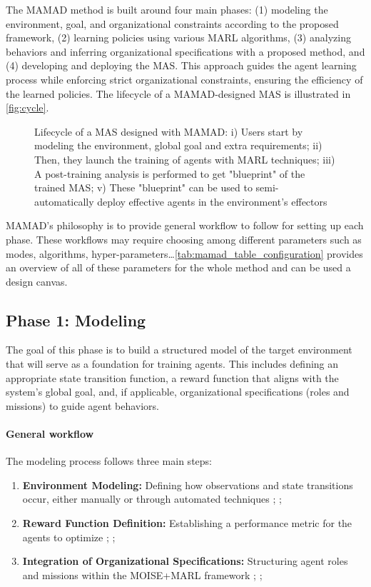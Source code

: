 \documentclass[pdflatex,sn-mathphys-num]{sn-jnl}%
\theoremstyle{thmstyleone}%
\theoremstyle{thmstyletwo}%
\theoremstyle{thmstylethree}%
\begin{document}
The MAMAD method is built around four main phases: (1) modeling the environment, goal, and organizational constraints according to the proposed framework, (2) learning policies using various MARL algorithms, (3) analyzing behaviors and inferring organizational specifications with a proposed method, and (4) developing and deploying the MAS. This approach guides the agent learning process while enforcing strict organizational constraints, ensuring the efficiency of the learned policies. The lifecycle of a MAMAD-designed MAS is illustrated in \autoref{fig:cycle}.



\begin{figure}[h!]
  \centering
  
  \caption{Lifecycle of a MAS designed with MAMAD: i) Users start by modeling the environment, global goal and extra requirements; \quad ii) Then, they launch the training of agents with MARL techniques; \quad iii) A post-training analysis is performed to get "blueprint" of the trained MAS; \quad v) These "blueprint" can be used to semi-automatically deploy effective agents in the environment's effectors}
  \label{fig:cycle}
\end{figure}

MAMAD's philosophy is to provide general workflow to follow for setting up each phase. These workflows may require choosing among different parameters such as modes, algorithms, hyper-parameters\dots \autoref{tab:mamad_table_configuration} provides an overview of all of these parameters for the whole method and can be used a design canvas.



\subsection{Phase 1: Modeling}

The goal of this phase is to build a structured model of the target environment that will serve as a foundation for training agents. This includes defining an appropriate state transition function, a reward function that aligns with the system's global goal, and, if applicable, organizational specifications (roles and missions) to guide agent behaviors.

\paragraph{\textbf{General workflow}}
The modeling process follows three main steps:
\begin{enumerate}
    \item \textbf{Environment Modeling:} Defining how observations and state transitions occur, either manually or through automated techniques ; ;
    \item \textbf{Reward Function Definition:} Establishing a performance metric for the agents to optimize ; ;
    \item \textbf{Integration of Organizational Specifications:} Structuring agent roles and missions within the MOISE+MARL framework ; ;
\end{enumerate}
\end{document}
